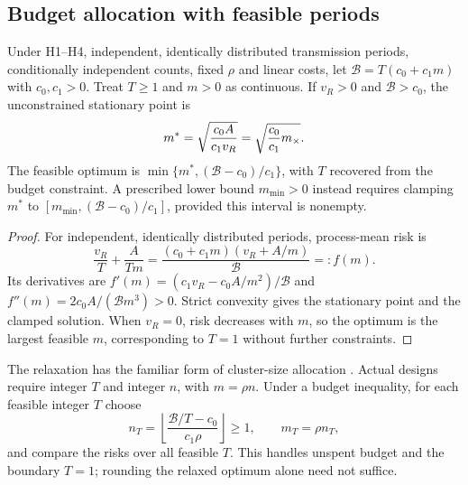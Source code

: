 \subsection{Budget allocation with feasible periods}
\label{app:allocation}

\begin{proposition}
\label{prop:allocation}
\label{app:prop3}
Under H1--H4, independent, identically distributed transmission periods, conditionally independent counts, fixed $\rho$ and linear costs, let $\mathcal B=T(c_0+c_1m)$ with $c_0,c_1>0$. Treat $T\ge1$ and $m>0$ as continuous. If $v_R>0$ and $\mathcal B>c_0$, the unconstrained stationary point is
\begin{equation}
 m^*=\sqrt{\frac{c_0A}{c_1v_R}}=\sqrt{\frac{c_0}{c_1}m_{\times}}.
 \label{eq:optimal-m}
\end{equation}
The feasible optimum is $\min\{m^*,(\mathcal B-c_0)/c_1\}$, with $T$ recovered from the budget constraint. A prescribed lower bound $m_{\min}>0$ instead requires clamping $m^*$ to $[m_{\min},(\mathcal B-c_0)/c_1]$, provided this interval is nonempty.
\end{proposition}

\begin{proof}
For independent, identically distributed periods, process-mean risk is
\begin{equation}
 \frac{v_R}{T}+\frac{A}{Tm}
 =\frac{(c_0+c_1m)(v_R+A/m)}{\mathcal B}=:f(m).
 \label{eq:alloc-indep}
\end{equation}
Its derivatives are $f'(m)=(c_1v_R-c_0A/m^2)/\mathcal B$ and $f''(m)=2c_0A/(\mathcal B m^3)>0$. Strict convexity gives the stationary point and the clamped solution. When $v_R=0$, risk decreases with $m$, so the optimum is the largest feasible $m$, corresponding to $T=1$ without further constraints.
\end{proof}

The relaxation has the familiar form of cluster-size allocation \citep{cochran1977sampling, raudenbush1997statistical}. Actual designs require integer $T$ and integer $n$, with $m=\rho n$. Under a budget inequality, for each feasible integer $T$ choose
\begin{equation}
 n_T=\left\lfloor\frac{\mathcal B/T-c_0}{c_1\rho}\right\rfloor\ge1,
 \qquad m_T=\rho n_T,
\end{equation}
and compare the risks over all feasible $T$. This handles unspent budget and the boundary $T=1$; rounding the relaxed optimum alone need not suffice.

